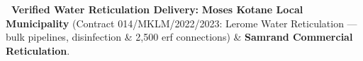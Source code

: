 \vfill

\noindent
\begin{tcolorbox}[enhanced, colback=white, colframe=mhnavy, boxrule=0.8pt, arc=3pt, left=8pt, right=8pt, top=6pt, bottom=6pt, drop shadow=black!3]
    {\fontsize{8pt}{10.6pt}\selectfont\color{mhnavy}\bfseries\faCheckCircle\ Verified Water Reticulation Delivery:}\quad
    {\fontsize{8pt}{10.6pt}\selectfont\color{mhtext}
    \textbf{Moses Kotane Local Municipality} (Contract 014/MKLM/2022/2023: Lerome Water Reticulation --- bulk pipelines, disinfection \& 2,500 erf connections) \& \textbf{Samrand Commercial Reticulation}.
    }
\end{tcolorbox}

\clearpage
